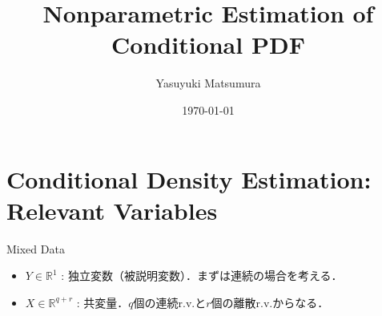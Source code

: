 \documentclass[xcolor=svgnames,dvipdfmx,cjk]{beamer}
\theoremstyle{example}
\begin{document}
 

\title[Li and Racine (2007) Chap. 5]{Nonparametric Estimation of Conditional PDF} 
\author[Y. Matsumura]{Yasuyuki Matsumura}          
\date{\today}


\begin{frame}                  
\titlepage                     
\end{frame}


\begin{frame}                  
\tableofcontents
\end{frame}




\section{Conditional Density Estimation: Relevant Variables}

\begin{frame}{Mixed Data}
  \begin{itemize}
    \item $Y \in \mathbb{R}^1$
    : 独立変数（被説明変数）．まずは連続の場合を考える．
    \item $X \in \mathbb{R}^{q+r}$
    : 共変量．$q$個の連続r.v.と$r$個の離散r.v.からなる．
  \end{itemize}
\end{frame}
\end{document}

